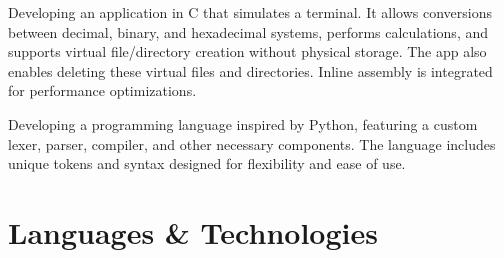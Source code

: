 \documentclass[letterpaper]{twentysecondcv} %
\begin{document}
\begin{twenty} %

    {Developing an application in C that simulates a terminal. It allows conversions between decimal, binary, and hexadecimal systems, performs calculations, and supports virtual file/directory creation without physical storage. The app also enables deleting these virtual files and directories. Inline assembly is integrated for performance optimizations.}

    {Developing a programming language inspired by Python, featuring a custom lexer, parser, compiler, and other necessary components. The language includes unique tokens and syntax designed for flexibility and ease of use.}

\end{twenty}



\section{Languages \& Technologies}

\begin{twentyshort} %




\end{twentyshort}
\end{document}
